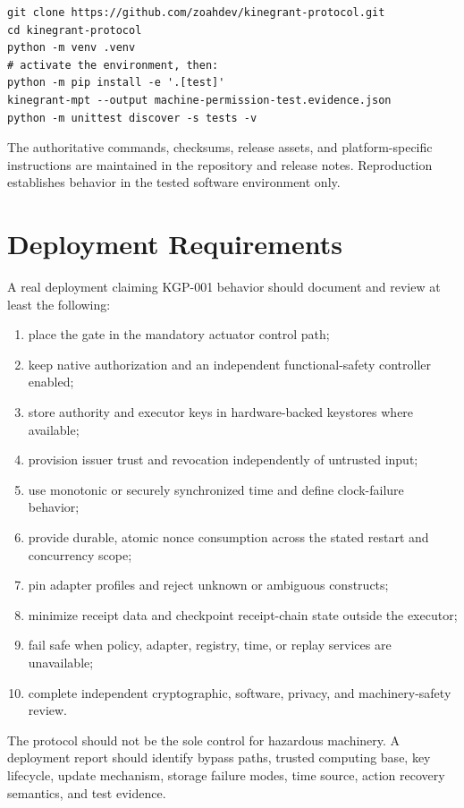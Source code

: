 \documentclass[10.5pt,a4paper]{article}
\begin{document}
\begin{lstlisting}[style=kgp]
git clone https://github.com/zoahdev/kinegrant-protocol.git
cd kinegrant-protocol
python -m venv .venv
# activate the environment, then:
python -m pip install -e '.[test]'
kinegrant-mpt --output machine-permission-test.evidence.json
python -m unittest discover -s tests -v
\end{lstlisting}

The authoritative commands, checksums, release assets, and platform-specific instructions are
maintained in the repository and release notes. Reproduction establishes behavior in the tested
software environment only.

\section{Deployment Requirements}

A real deployment claiming KGP-001 behavior should document and review at least the following:

\begin{enumerate}
  \item place the gate in the mandatory actuator control path;
  \item keep native authorization and an independent functional-safety controller enabled;
  \item store authority and executor keys in hardware-backed keystores where available;
  \item provision issuer trust and revocation independently of untrusted input;
  \item use monotonic or securely synchronized time and define clock-failure behavior;
  \item provide durable, atomic nonce consumption across the stated restart and concurrency scope;
  \item pin adapter profiles and reject unknown or ambiguous constructs;
  \item minimize receipt data and checkpoint receipt-chain state outside the executor;
  \item fail safe when policy, adapter, registry, time, or replay services are unavailable;
  \item complete independent cryptographic, software, privacy, and machinery-safety review.
\end{enumerate}

The protocol should not be the sole control for hazardous machinery. A deployment report should
identify bypass paths, trusted computing base, key lifecycle, update mechanism, storage failure
modes, time source, action recovery semantics, and test evidence.
\end{document}
